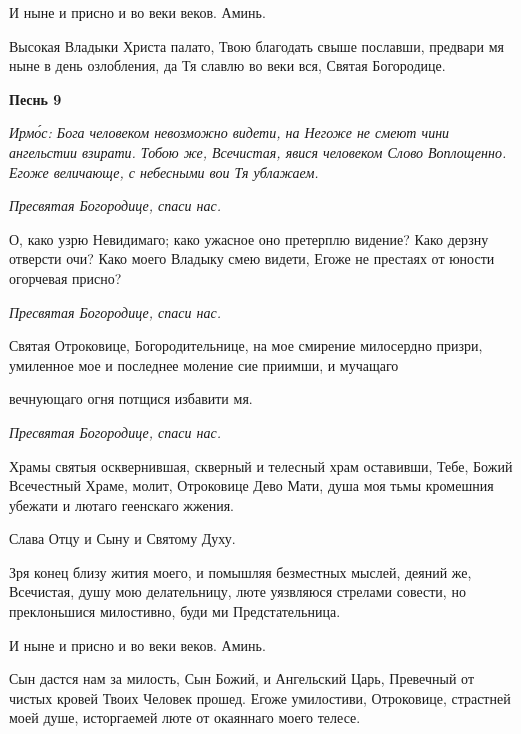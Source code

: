    И ныне и присно и во веки веков. Аминь.



   Высокая Владыки Христа палато, Твою благодать свыше пославши,
предвари мя ныне в день озлобления, да Тя славлю во веки вся, Святая
Богородице.



 

\bfseries Песнь 9\normalfont{}


 \itshape Ирмо́с:\normalfont{} Бога человеком невозможно видети, на Негоже не смеют чини
ангельстии взирати. Тобою же, Всечистая, явися человеком Слово Воплощенно.
Егоже величающе, с небесными вои Тя ублажаем.



 \itshape  Пресвятая Богородице, спаси нас.
\normalfont{}


   О, како узрю Невидимаго; како ужасное оно претерплю видение? Како
дерзну отверсти очи? Како моего Владыку смею видети, Егоже не престаях
от юности огорчевая присно?



 \itshape  Пресвятая Богородице, спаси нас.
\normalfont{}


   Святая Отроковице, Богородительнице, на мое смирение милосердно
призри, умиленное мое и последнее моление сие приимши, и мучащаго

вечнующаго огня потщися избавити мя.



 \itshape  Пресвятая Богородице, спаси нас.
\normalfont{}


   Храмы святыя осквернившая, скверный и телесный храм оставивши,
Тебе, Божий Всечестный Храме, молит, Отроковице Дево Мати, душа моя
тьмы кромешния убежати и лютаго геенскаго жжения.



   Слава Отцу и Сыну и Святому Духу.



   Зря конец близу жития моего, и помышляя безместных мыслей, деяний
же, Всечистая, душу мою делательницу, люте уязвляюся стрелами совести,
но преклоньшися милостивно, буди ми Предстательница.



   И ныне и присно и во веки веков. Аминь.



   Сын дастся нам за милость, Сын Божий, и Ангельский Царь,
Превечный от чистых кровей Твоих Человек прошед. Егоже умилостиви,
Отроковице, страстней моей душе, исторгаемей люте от окаяннаго моего
телесе.




